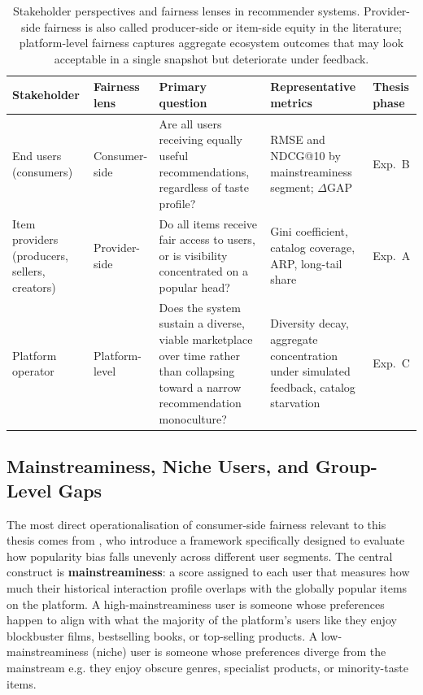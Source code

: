 \documentclass[11pt,a4paper]{report}
\begin{document}
\begin{table}[htbp]
  \centering
  \caption{Stakeholder perspectives and fairness lenses in recommender systems. Provider-side fairness is also called producer-side or item-side equity in the literature; platform-level fairness captures aggregate ecosystem outcomes that may look acceptable in a single snapshot but deteriorate under feedback.}
  \label{tab:stakeholder_fairness}
  \footnotesize
  \setlength{\tabcolsep}{4pt}
  \renewcommand{\arraystretch}{1.2}
  \begin{tabularx}{\textwidth}{@{}L{0.14\textwidth}L{0.14\textwidth}X L{0.22\textwidth}L{0.12\textwidth}@{}}
    \toprule
    \textbf{Stakeholder} & \textbf{Fairness lens} & \textbf{Primary question} & \textbf{Representative metrics} & \textbf{Thesis phase} \\
    \midrule
    End users (consumers) &
    Consumer-side &
    Are all users receiving equally useful recommendations, regardless of taste profile? &
    RMSE and NDCG@10 by mainstreaminess segment; $\Delta$GAP \citep{abdollahpouri2021usercentered, jarvelin2002cumulated} &
    Exp.~B \\
    Item providers (producers, sellers, creators) &
    Provider-side &
    Do all items receive fair access to users, or is visibility concentrated on a popular head? &
    Gini coefficient, catalog coverage, ARP, long-tail share &
    Exp.~A \\
    Platform operator &
    Platform-level &
    Does the system sustain a diverse, viable marketplace over time rather than collapsing toward a narrow recommendation monoculture? &
    Diversity decay, aggregate concentration under simulated feedback, catalog starvation &
    Exp.~C \\
    \bottomrule
  \end{tabularx}
\end{table}

\subsection*{Mainstreaminess, Niche Users, and Group-Level Gaps}

The most direct operationalisation of consumer-side fairness relevant to this thesis comes from \citet{abdollahpouri2021usercentered}, who introduce a framework specifically designed to evaluate how popularity bias falls unevenly across different user segments. The central construct is \textbf{mainstreaminess}: a score assigned to each user that measures how much their historical interaction profile overlaps with the globally popular items on the platform. A high-mainstreaminess user is someone whose preferences happen to align with what the majority of the platform's users like they enjoy blockbuster films, bestselling books, or top-selling products. A low-mainstreaminess (niche) user is someone whose preferences diverge from the mainstream e.g. they enjoy obscure genres, specialist products, or minority-taste items.
\end{document}
